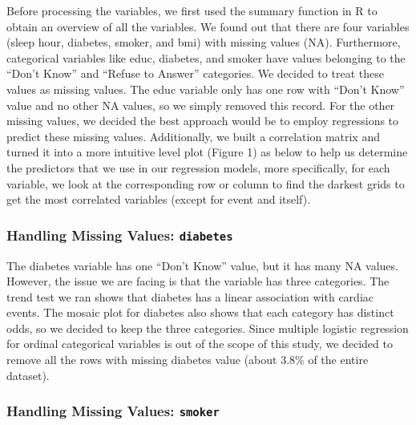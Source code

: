 \documentclass[12pt]{article}
\begin{document}
Before processing the variables, we first used the summary function in R to obtain an overview of all the variables. We found out that there are four variables (sleep hour, diabetes, smoker, and bmi) with missing values (NA). Furthermore, categorical variables like educ, diabetes, and smoker have values belonging to the “Don’t Know” and “Refuse to Answer” categories. We decided to treat these values as missing values. The educ variable only has one row with “Don’t Know” value and no other NA values, so we simply removed this record. For the other missing values, we decided the best approach would be to employ regressions to predict these missing values. Additionally, we built a correlation matrix and turned it into a more intuitive level plot (Figure 1) as below to help us determine the predictors that we use in our regression models, more specifically, for each variable, we look at the corresponding row or column to find the darkest grids to get the most correlated variables (except for event and itself).





\subsubsection*{{{Handling Missing Values: }}\protect\Verb+diabetes+}

The diabetes variable has one “Don’t Know” value, but it has many NA values. However, the issue we are facing is that the variable has three categories. The trend test we ran shows that diabetes has a linear association with cardiac events. The mosaic plot for diabetes also shows that each category has distinct odds, so we decided to keep the three categories. Since multiple logistic regression for ordinal categorical variables is out of the scope of this study, we decided to remove all the rows with missing diabetes value (about 3.8\% of the entire dataset).

\subsubsection*{{{Handling Missing Values: }}\protect\Verb+smoker+}
\end{document}
